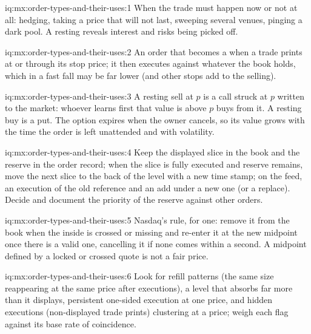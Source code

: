 \begin{solution}{iq:mx:order-types-and-their-uses:1}
When the trade must happen now or not at all: hedging, taking a price that will not last, sweeping several venues, pinging a dark pool. A resting  reveals interest and risks being picked off. 
\end{solution}

\begin{solution}{iq:mx:order-types-and-their-uses:2}
An order that becomes a  when a trade prints at or through its stop price; it then executes against whatever the book holds, which in a fast
fall may be far lower (and other stops add to the selling). 
\end{solution}

\begin{solution}{iq:mx:order-types-and-their-uses:3}
A resting sell at $p$ is a call struck at $p$ written to the market: whoever learns first that value is above $p$ buys from it. A resting buy is a put.
The option expires when the owner cancels, so its value grows with the time the order is left unattended and with volatility. 
\end{solution}

\begin{solution}{iq:mx:order-types-and-their-uses:4}
Keep the displayed slice in the book and the reserve in the order record; when the slice is fully executed and reserve remains, move the next slice to
the back of the level with a new time stamp; on the feed, an execution of the old reference and an add under a new one (or a replace). Decide and
document the priority of the reserve against other orders. 
\end{solution}

\begin{solution}{iq:mx:order-types-and-their-uses:5}
Nasdaq's rule, for one: remove it from the book when the inside is crossed or missing and re-enter it at the new midpoint once there is a valid one,
cancelling it if none comes within a second. A midpoint defined by a locked or crossed quote is not a fair price. 
\end{solution}

\begin{solution}{iq:mx:order-types-and-their-uses:6}
Look for refill patterns (the same size reappearing at the same price after executions), a level that absorbs far more than it displays, persistent
one-sided execution at one price, and hidden executions (non-displayed trade prints) clustering at a price; weigh each flag against its base rate of
coincidence. 
\end{solution}
